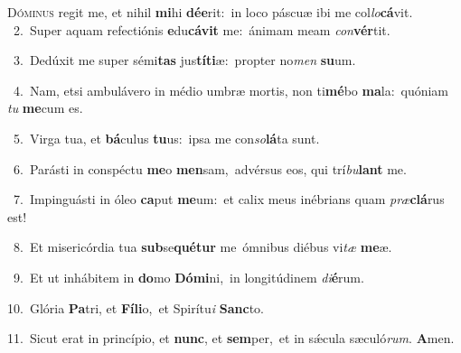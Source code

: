 \lettrine{\initial\textcolor{\initialcolor}{D}}{óminus} regit me, et nihil \textbf{mi}\-hi \textbf{dé}\-\textbf{e}rit:~\star in loco páscuæ ibi me col\-\textit{lo}\-\textbf{cá}vit.\\
{\numbfont\textcolor{\numbcolor}{~2.}}~Super aquam refectiónis \textbf{e}\-du\-\textbf{cá}\-\textbf{vit} me:~\star ánimam meam \textit{con}\-\textbf{vér}tit.\par
{\numbfont\textcolor{\numbcolor}{~3.}}~Dedúxit me super sémi\textbf{tas} jus\-\textbf{tí}\-\textbf{ti}æ:~\star propter no\textit{men} \textbf{su}\-um.\par
{\numbfont\textcolor{\numbcolor}{~4.}}~Nam, etsi ambulávero in médio umbræ mortis, non ti\-\textbf{mé}\-bo \textbf{ma}\-la:~\star quóniam \textit{tu} \textbf{me}\-cum es.\par
{\numbfont\textcolor{\numbcolor}{~5.}}~Virga tua, et \textbf{bá}\-culus \textbf{tu}\-us:~\star ipsa me con\-\textit{so}\-\textbf{lá}ta sunt.\par
{\numbfont\textcolor{\numbcolor}{~6.}}~Parásti in conspéctu \textbf{me}\-o \textbf{men}\-sam,~\star advérsus eos, qui trí\-\textit{bu}\-\textbf{lant} me.\par
{\numbfont\textcolor{\numbcolor}{~7.}}~Impinguásti in óleo \textbf{ca}\-put \textbf{me}\-um:~\star et calix meus inébrians quam \textit{præ}\-\textbf{clá}rus est!\par
{\numbfont\textcolor{\numbcolor}{~8.}}~Et misericórdia tua \textbf{sub}\-se\-\textbf{qué}\-\textbf{tur} me~\star ómnibus diébus vi\textit{tæ} \textbf{me}\-æ.\par
{\numbfont\textcolor{\numbcolor}{~9.}}~Et ut inhábitem in \textbf{do}\-mo \textbf{Dó}\-\textbf{mi}ni,~\star in longitúdinem \textit{di}\-\textbf{é}rum.\par
{\numbfont\textcolor{\numbcolor}{10.}}~Glória \textbf{Pa}\-tri, et \textbf{Fí}\-\textbf{li}o,~\star et Spirítu\textit{i} \textbf{Sanc}\-to.\par
{\numbfont\textcolor{\numbcolor}{11.}}~Sicut erat in princípio, et \textbf{nunc}\-, et \textbf{sem}\-per,~\star et in sǽcula sæculó\-\textit{rum}\-. \textbf{A}\-men.\par
